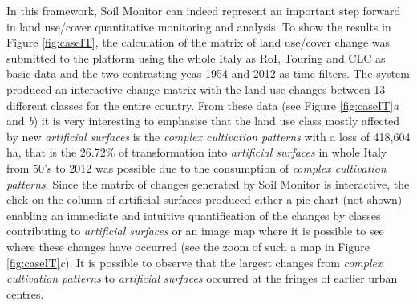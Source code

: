\documentclass[APA,LATO1COL,doublespace]{WileyNJD-v2}
\newcommand{\update}[1]{\emph{\textcolor{blue}{#1}}}     %
\begin{document}
In this framework, Soil Monitor can indeed represent an important step forward in land use/cover quantitative monitoring and analysis.
To show the results in Figure \ref{fig:caseIT}, the calculation of the matrix of land use/cover change was submitted to the platform using the whole Italy as RoI,
Touring and CLC as basic data and
the two contrasting yeas 1954 and 2012 as time filters.
The system produced an interactive change matrix with the land use changes between 13 different classes for the entire country.
From these data (see Figure \ref{fig:caseIT}\textit{a} and \textit{b}) it is very interesting to emphasise that the land use class mostly affected by new \textit{artificial surfaces} is the \textit{complex cultivation patterns} with a loss of 418,604 ha, that is the 26.72\% of transformation into \textit{artificial surfaces} in whole Italy from 50's to 2012 was possible due to the consumption of \textit{complex cultivation patterns}.
Since the matrix of changes generated by Soil Monitor is interactive, the click on the column of artificial surfaces produced either a pie chart (not shown) enabling an immediate and intuitive quantification of the changes by classes contributing to \textit{artificial surfaces} or an image map where it is possible to see where these changes have occurred (see the zoom of such a map in Figure \ref{fig:caseIT}\textit{c}).
It is possible to observe that the largest changes from \textit{complex cultivation patterns} to \textit{artificial surfaces} occurred at the fringes of earlier urban centres.
\end{document}
